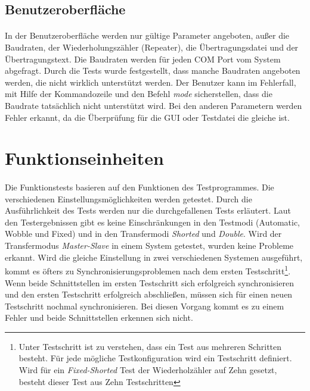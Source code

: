 \subsection{Benutzeroberfläche}
\paragraph{}
In der Benutzeroberfläche werden nur gültige Parameter angeboten, außer die Baudraten, der Wiederholungszähler (Repeater), die Übertragungsdatei und der Übertragungstext. Die Baudraten werden für jeden COM Port vom System abgefragt. Durch die Tests wurde festgestellt, dass manche Baudraten angeboten werden, die nicht wirklich unterstützt werden. Der Benutzer kann im Fehlerfall, mit Hilfe der Kommandozeile und den Befehl \textit{mode} sicherstellen, dass die Baudrate tatsächlich nicht unterstützt wird. Bei den anderen Parametern werden Fehler erkannt, da die Überprüfung für die GUI oder Testdatei die gleiche ist.



\section{Funktionseinheiten}
\paragraph{}
Die Funktionstests basieren auf den Funktionen des Testprogrammes. Die verschiedenen Einstellungsmöglichkeiten werden getestet. Durch die Ausführlichkeit des Tests werden nur die durchgefallenen Tests erläutert. Laut den  Testergebnissen gibt es keine Einschränkungen in den Testmodi (Automatic, Wobble und Fixed) und in den Transfermodi \textit{Shorted} und \textit{Double}. Wird der Transfermodus \textit{Master-Slave} in einem System getestet, wurden keine Probleme erkannt. Wird die gleiche Einstellung in zwei verschiedenen Systemen ausgeführt, kommt es öfters zu Synchronisierungsproblemen nach dem ersten Testschritt\footnote{Unter Testschritt ist zu verstehen, dass ein Test aus mehreren Schritten besteht. Für jede mögliche Testkonfiguration wird ein Testschritt definiert. Wird für ein \textit{Fixed-Shorted} Test der Wiederholzähler auf Zehn gesetzt, besteht dieser Test aus Zehn Testschritten}. Wenn beide Schnittstellen im ersten Testschritt sich erfolgreich synchronisieren und den ersten Testschritt erfolgreich abschließen, müssen sich für einen neuen Testschritt nochmal synchronisieren. Bei diesen Vorgang kommt es zu einem Fehler und beide Schnittstellen erkennen sich nicht.